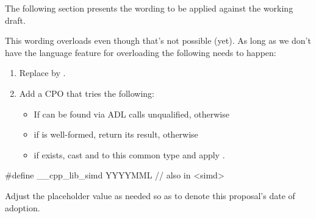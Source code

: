 The following section presents the wording to be applied against the \CC{}
working draft.

This wording overloads  even though that's not possible (yet).
As long as we don't have the language feature for overloading  the following needs to happen:
\begin{enumerate}
  \item Replace  by .
  \item Add a \std{} CPO that tries the following:
    \begin{itemize}
      \item If  can be found via ADL calls  unqualified, otherwise
      \item if  is well-formed, return its result, otherwise
      \item if \std{} exists, cast  and  to this common type and apply .
    \end{itemize}
\end{enumerate}

\begin{wgText}
  \begin{codeblock}
    #define __cpp_lib_simd YYYYMML // also in <simd>
  \end{codeblock}
\end{wgText}
Adjust the placeholder value as needed so as to denote this proposal's date of adoption.

\begin{wgText}
  \setcounter{WGClause}{28}
  \setcounter{WGSubSection}{8}
  
\end{wgText}


